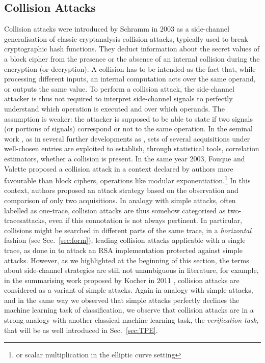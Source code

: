 \subsection{Collision Attacks}
Collision attacks were introduced by Schramm \etal in 2003 \cite{schramm2003new} as a side-channel generalisation of classic cryptanalysis collision attacks, typically used to break cryptographic hash functions. They deduct information about the secret values of a block cipher from the presence or the absence of an internal collision during the encryption (or decryption). A collision has to be intended as the fact that, while processing different inputs, an internal computation acts over the same operand, or outputs the same value. To perform a collision attack, the side-channel attacker is thus not required to interpret side-channel signals to perfectly understand which operation is executed and over which operands. The assumption is weaker: the attacker is supposed to be able to state if two signals (or portions of signals) correspond or not to the same operation. In the seminal work \cite{schramm2003new}, as in several further developments as \cite{ledig2004enhancing,schramm2004collision,bogdanov2007improved,bogdanov2008multiple}, sets of several acquisitions under well-chosen entries are exploited to establish, through statistical tools, \eg correlation estimators, whether a collision is present. In the same year 2003, Fouque and Valette \cite{fouque2003doubling} proposed a collision attack in a context declared by authors more favourable than block ciphers, \ie operations like modular exponentiation.\footnote{or scalar multiplication in the elliptic curve setting} In this context, authors proposed an attack strategy based on the observation and comparison of only two acquisitions. In analogy with simple attacks, often labelled as \textquotedbl one-trace\textquotedbl , collision attacks are thus somehow categorised as \textquotedbl two-traces\textquotedbl attacks, even if this connotation is not always pertinent. In particular, collisions might be searched in different parts of the same trace, \ie in a \emph{horizontal} fashion (see Sec.~\ref{sec:form}), leading collision attacks applicable with a single trace, \eg as done in \cite{clavier2010horizontal} to attack an RSA implementation protected against simple attacks. However, as we highlighted at the beginning of this section, the terms about side-channel strategies are still not unambiguous in literature, for example, in the summarising work proposed by Kocher \etal in 2011 \cite{kocher2011introduction}, collision attacks are considered as a variant of simple attacks. Again in analogy with simple attacks, and in the same way we observed that simple attacks perfectly declines the machine learning task of classification, we observe that collision attacks are in a strong analogy with another classical machine learning task, \ie the \emph{verification task}, that will be as well introduced in Sec.~\ref{sec:TPE}.


